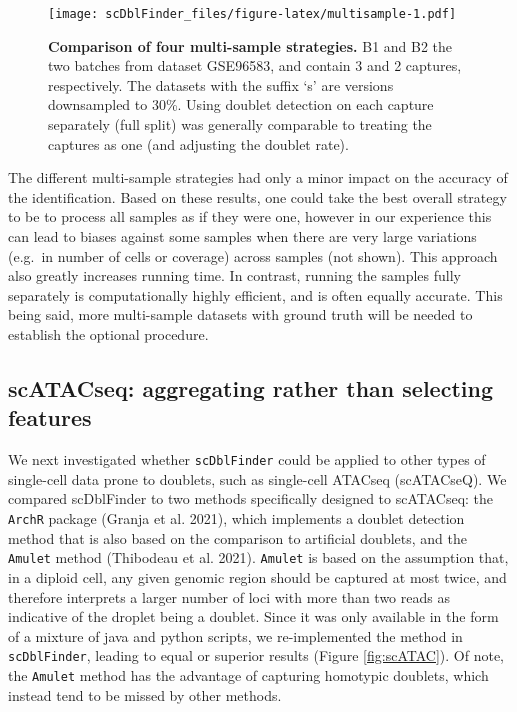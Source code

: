 \documentclass[10pt,a4paper,twocolumn]{article}
\begin{document}
\begin{figure}
\centering
\texttt{[image: scDblFinder\_files/figure-latex/multisample-1.pdf]}
\caption{\label{fig:multisample}\textbf{Comparison of four multi-sample strategies.} B1 and B2 the two batches from dataset GSE96583, and contain 3 and 2 captures, respectively. The datasets with the suffix `s' are versions downsampled to 30\%. Using doublet detection on each capture separately (full split) was generally comparable to treating the captures as one (and adjusting the doublet rate).}
\end{figure}



The different multi-sample strategies had only a minor impact on the accuracy of the identification.
Based on these results, one could take the best overall strategy to be to process all samples as if they were one, however in our experience this can lead to biases against some samples when there are very large variations (e.g.~in number of cells or coverage) across samples (not shown).
This approach also greatly increases running time.
In contrast, running the samples fully separately is computationally highly efficient, and is often equally accurate.
This being said, more multi-sample datasets with ground truth will be needed to establish the optional procedure.

\hypertarget{scatacseq-aggregating-rather-than-selecting-features}{%
\subsection{scATACseq: aggregating rather than selecting features}\label{scatacseq-aggregating-rather-than-selecting-features}}

We next investigated whether \texttt{scDblFinder} could be applied to other types of single-cell data prone to doublets, such as single-cell ATACseq (scATACseQ). We compared scDblFinder to two methods specifically designed to scATACseq: the \texttt{ArchR} package (Granja et al. 2021), which implements a doublet detection method that is also based on the comparison to artificial doublets, and the \texttt{Amulet} method (Thibodeau et al. 2021). \texttt{Amulet} is based on the assumption that, in a diploid cell, any given genomic region should be captured at most twice, and therefore interprets a larger number of loci with more than two reads as indicative of the droplet being a doublet. Since it was only available in the form of a mixture of java and python scripts, we re-implemented the method in \texttt{scDblFinder}, leading to equal or superior results (Figure \ref{fig:scATAC}). Of note, the \texttt{Amulet} method has the advantage of capturing homotypic doublets, which instead tend to be missed by other methods.
\end{document}
